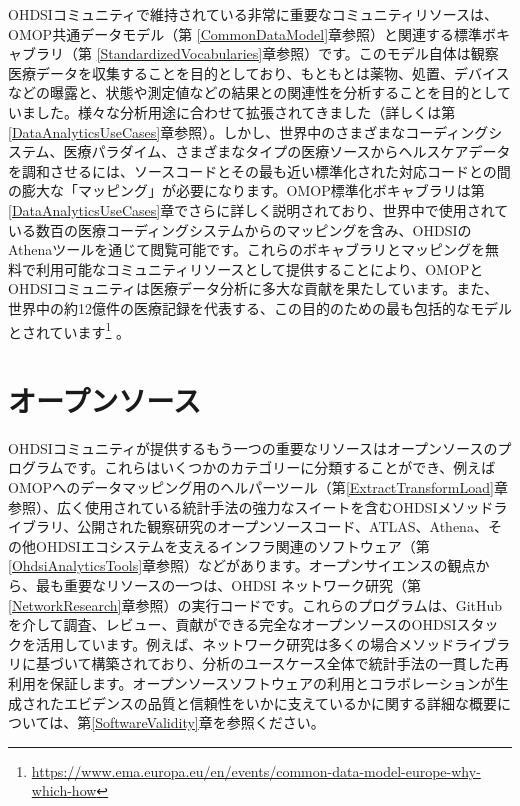 \documentclass[
  11pt]{book}
\theoremstyle{definition}
\theoremstyle{definition}
\theoremstyle{definition}
\theoremstyle{definition}
\theoremstyle{remark}
\begin{document}
OHDSIコミュニティで維持されている非常に重要なコミュニティリソースは、OMOP共通データモデル（第 \ref{CommonDataModel}章参照）と関連する標準ボキャブラリ（第 \ref{StandardizedVocabularies}章参照）です。このモデル自体は観察医療データを収集することを目的としており、もともとは薬物、処置、デバイスなどの曝露と、状態や測定値などの結果との関連性を分析することを目的としていました。様々な分析用途に合わせて拡張されてきました（詳しくは第\ref{DataAnalyticsUseCases}章参照）。しかし、世界中のさまざまなコーディングシステム、医療パラダイム、さまざまなタイプの医療ソースからヘルスケアデータを調和させるには、ソースコードとその最も近い標準化された対応コードとの間の膨大な「マッピング」が必要になります。OMOP標準化ボキャブラリは第 \ref{DataAnalyticsUseCases}章でさらに詳しく説明されており、世界中で使用されている数百の医療コーディングシステムからのマッピングを含み、OHDSIのAthenaツールを通じて閲覧可能です。これらのボキャブラリとマッピングを無料で利用可能なコミュニティリソースとして提供することにより、OMOPとOHDSIコミュニティは医療データ分析に多大な貢献を果たしています。また、世界中の約12億件の医療記録を代表する、この目的のための最も包括的なモデルとされています\footnote{\url{https://www.ema.europa.eu/en/events/common-data-model-europe-why-which-how}} \citep{garza_2016}。

\section{オープンソース}\label{ux30aaux30fcux30d7ux30f3ux30bdux30fcux30b9}


OHDSIコミュニティが提供するもう一つの重要なリソースはオープンソースのプログラムです。これらはいくつかのカテゴリーに分類することができ、例えばOMOPへのデータマッピング用のヘルパーツール（第\ref{ExtractTransformLoad}章参照）、広く使用されている統計手法の強力なスイートを含むOHDSIメソッドライブラリ、公開された観察研究のオープンソースコード、ATLAS、Athena、その他OHDSIエコシステムを支えるインフラ関連のソフトウェア（第\ref{OhdsiAnalyticsTools}章参照）などがあります。オープンサイエンスの観点から、最も重要なリソースの一つは、OHDSI ネットワーク研究（第\ref{NetworkResearch}章参照）の実行コードです。これらのプログラムは、GitHubを介して調査、レビュー、貢献ができる完全なオープンソースのOHDSIスタックを活用しています。例えば、ネットワーク研究は多くの場合メソッドライブラリに基づいて構築されており、分析のユースケース全体で統計手法の一貫した再利用を保証します。オープンソースソフトウェアの利用とコラボレーションが生成されたエビデンスの品質と信頼性をいかに支えているかに関する詳細な概要については、第\ref{SoftwareValidity}章を参照ください。
\end{document}
